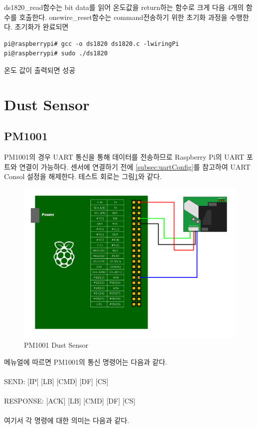 \documentclass[11pt
  , a4paper
  , article
  , oneside
]{memoir}
\begin{document}
ds1820_read함수는 bit data를 읽어 온도값을 return하는 함수로 크게 다음 4개의 함수를 호출한다.
onewire_reset함수는 command전송하기 위한 초기화 과정을 수행한다. 초기화가 완료되면 
\begin{lstlisting}[style=termstyle]
pi@raspberrypi# gcc -o ds1820 ds1820.c -lwiringPi
pi@raspberrypi# sudo ./ds1820
\end{lstlisting}
온도 값이 출력되면 성공
\section{Dust Sensor}
\subsection{PM1001}\label{subsec:pm1001Test}
PM1001의 경우 UART 통신을 통해 데이터를 전송하므로 Raspberry Pi의 UART 포트와 연결이 가능하다.
센서에 연결하기 전에 \ref{subsec:uartConfig}를 참고하여 UART Consol 설정을 해제한다.
테스트 회로는 그림\ref{fig:pm1001_test}와 같다.
\begin{figure}[!htb]
\centering
\includegraphics[width=1\textwidth]{./images/epics/PM1001Test.png}
\caption{PM1001 Dust Sensor}
\label{fig:pm1001_test}
\end{figure}
메뉴얼에 따르면 PM1001의 통신 명령어는 다음과 같다.\\
\\
        SEND: [IP] [LB] [CMD] [DF] [CS]\\
\\
        RESPONSE: [ACK] [LB] [CMD] [DF] [CS]\\
\\
여기서 각 명령에 대한 의미는 다음과 같다.\newline
\end{document}
